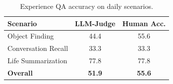 \begin{table}[H]
\centering
\small
\setlength{\tabcolsep}{3pt}
\renewcommand{\arraystretch}{1.10}
\begin{tabular*}{\columnwidth}{@{\extracolsep{\fill}}lcc@{}}
\toprule
\textbf{Scenario} & 
\textbf{LLM-Judge} & 
\textbf{Human Acc.} \\
\midrule
Object Finding       & 44.4 & 55.6 \\
Conversation Recall  & 33.3 & 33.3 \\
Life Summarization   & 77.8 & 77.8 \\
\midrule
\textbf{Overall}     & \textbf{51.9} & \textbf{55.6} \\
\bottomrule
\end{tabular*}
\caption{
Experience QA accuracy on daily scenarios.
}
\label{tab:qa_accuracy}
\vspace{-3mm}
\end{table}